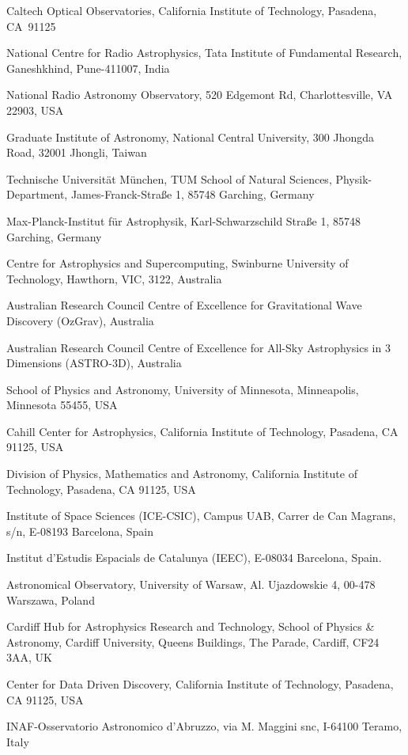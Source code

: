\documentclass{nature_plusfigure}
\begin{document}
\begin{small}
\begin{affiliations}
\item Caltech Optical Observatories, California Institute of Technology, Pasadena, CA 91125
\item National Centre for Radio Astrophysics, Tata Institute of Fundamental Research, Ganeshkhind, Pune-411007, India
\item National Radio Astronomy Observatory, 520 Edgemont Rd, Charlottesville, VA 22903, USA
\item Graduate Institute of Astronomy, National Central University, 300 Jhongda Road, 32001 Jhongli, Taiwan
\item Technische Universit{\"a}t M{\"u}nchen, TUM School of Natural Sciences, Physik-Department, James-Franck-Stra{\ss}e 1, 85748 Garching, Germany
\item Max-Planck-Institut f{\"u}r Astrophysik, Karl-Schwarzschild Stra{\ss}e 1, 85748 Garching, Germany
\item Centre for Astrophysics and Supercomputing, Swinburne University of Technology, Hawthorn, VIC, 3122, Australia
\item Australian Research Council Centre of Excellence for Gravitational Wave Discovery (OzGrav), Australia
\item Australian Research Council Centre of Excellence for All-Sky Astrophysics in 3 Dimensions (ASTRO-3D), Australia
\item School of Physics and Astronomy, University of Minnesota, Minneapolis, Minnesota 55455, USA
\item Cahill Center for Astrophysics, California Institute of Technology, Pasadena, CA 91125, USA
\item Division of Physics, Mathematics and Astronomy, California Institute of Technology, Pasadena, CA 91125, USA
\item Institute of Space Sciences (ICE-CSIC), Campus UAB, Carrer de Can Magrans, s/n, E-08193 Barcelona, Spain
\item Institut d’Estudis Espacials de Catalunya (IEEC), E-08034 Barcelona, Spain.
\item Astronomical Observatory, University of Warsaw, Al. Ujazdowskie 4, 00-478 Warszawa, Poland
\item Cardiff Hub for Astrophysics Research and Technology, School of Physics \& Astronomy, Cardiff University, Queens Buildings, The Parade, Cardiff, CF24 3AA, UK
\item Center for Data Driven Discovery, California Institute of Technology, Pasadena, CA 91125, USA
\item INAF-Osservatorio Astronomico d’Abruzzo, via M. Maggini snc, I-64100 Teramo, Italy

\end{affiliations}
\end{small}
\end{document}
